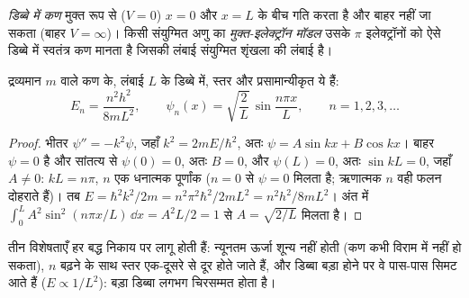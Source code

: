\begin{definition}[डिब्बे में कण, मुक्त-इलेक्ट्रॉन मॉडल]\label{def:b3:quantum-model-systems:box}
\emph{डिब्बे में कण} मुक्त रूप से ($V = 0$)
$x = 0$ और $x = L$ के बीच गति करता है और बाहर नहीं जा सकता (बाहर $V = \infty$)।
किसी संयुग्मित अणु का
\emph{मुक्त-इलेक्ट्रॉन मॉडल} उसके
$\pi$ इलेक्ट्रॉनों को ऐसे डिब्बे में स्वतंत्र कण मानता है जिसकी
लंबाई संयुग्मित शृंखला की लंबाई है।
\end{definition}

\begin{theorem}[डिब्बे के स्तर]\label{thm:b3:quantum-model-systems:box}
द्रव्यमान $m$ वाले कण के, लंबाई
$L$ के डिब्बे में, स्तर और प्रसामान्यीकृत  ये हैं:
\[
E_n = \frac{n^2h^2}{8mL^2}, \qquad \psi_n(x) = \sqrt{\frac2L}\,\sin\frac{n\pi
x}{L}, \qquad n = 1, 2, 3, \dots
\]
\end{theorem}

\begin{proof}
भीतर $\psi'' = -k^2\psi$, जहाँ $k^2 = 2mE/\hbar^2$, अतः $\psi = A\sin kx +
B\cos kx$। बाहर $\psi = 0$ है और सांतत्य से $\psi(0) = 0$, अतः $B =
0$, और $\psi(L) = 0$, अतः $\sin kL = 0$, जहाँ $A \ne 0$: $kL = n\pi$, $n$ एक
धनात्मक पूर्णांक ($n = 0$ से $\psi = 0$ मिलता है; ऋणात्मक $n$ वही
फलन दोहराते हैं)। तब $E = \hbar^2k^2/2m = n^2\pi^2\hbar^2/2mL^2 = n^2h^2/8mL^2$।
अंत में $\int_0^L A^2\sin^2(n\pi x/L)\,\dd x = A^2L/2 = 1$ से $A =
\sqrt{2/L}$ मिलता है।
\end{proof}

तीन विशेषताएँ हर बद्ध निकाय पर लागू होती हैं: न्यूनतम ऊर्जा शून्य नहीं
होती (कण कभी विराम में नहीं हो सकता), $n$ बढ़ने के साथ स्तर एक-दूसरे से दूर
होते जाते हैं, और डिब्बा बड़ा होने पर वे पास-पास सिमट आते हैं ($E \propto 1/L^2$):
बड़ा डिब्बा लगभग चिरसम्मत होता है।

